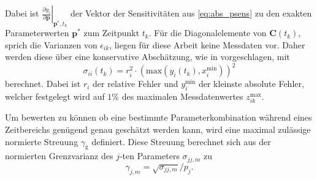 Dabei ist $\left.\frac{\partial y_i}{\partial \pmb{p}}\right|_{\pmb{p}^*,t_k}$ der Vektor der Sensitivitäten aus \eqref{eq:abs_psens} zu den exakten Parameterwerten $\pmb{p}^*$ zum Zeitpunkt $t_k$. Für die Diagonalelemente von $\pmb{C}(t_k)$, sprich die Varianzen von $\epsilon_{ik}$, liegen für diese Arbeit keine Messdaten vor. Daher werden diese über eine konservative Abschätzung, wie in \cite{Majer.1998} vorgeschlagen, mit
\begin{equation}
\sigma_{ii}(t_k)=r_i^2\cdot\left(\mathrm{max}\left(y_i(t_k),x_i^\mathrm{min}\right)\right)^2
\end{equation}
berechnet. Dabei ist $r_i$ der relative Fehler und $y_i^\mathrm{min}$ der kleinste absolute Fehler, welcher festgelegt wird auf $1\%$ des maximalen Messdatenwertes $z^\mathrm{max}_{ik}$.

Um bewerten zu können ob eine bestimmte Parameterkombination während eines Zeitbereichs genügend genau geschätzt werden kann, wird eine maximal zulässige normierte Streuung $\gamma_\mathrm{g}$ definiert. Diese Streuung berechnet sich aus der normierten Grenzvarianz des $j$-ten Parameters $\sigma_{jj,m}$ zu 
\begin{equation}
\gamma_{j,m} = \sqrt{\sigma_{jj,m}}/p_j.
\end{equation}

